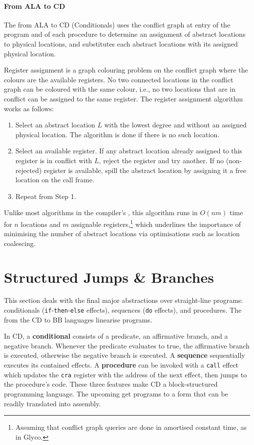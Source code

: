 \documentclass[main.tex]{subfiles}
\begin{document}
\paragraph{From ALA to CD} The  from ALA to CD (Conditionals) uses the conflict graph at entry of the program and of each procedure to determine an assignment of abstract locations to physical locations, and substitutes each abstract locations with its assigned physical location.

Register assignment is a graph colouring problem on the conflict graph where the colours are the available registers. No two connected locations in the conflict graph can be coloured with the same colour, i.e., no two locations that are in conflict can be assigned to the same register. The register assignment algorithm works as follows:
\begin{enumerate}
	\item Select an abstract location $L$ with the lowest degree and without an assigned physical location. The algorithm is done if there is no such location.
	\item Select an available register. If any abstract location already assigned to this register is in conflict with $L$, reject the register and try another. If no (non-rejected) register is available, spill the abstract location by assigning it a free location on the call frame.
	\item Repeat from Step 1.
\end{enumerate}

Unlike most algorithms in the compiler's , this algorithm runs in $O(nm)$ time for $n$ locations and $m$ assignable registers,\footnote{Assuming that conflict graph queries are done in amortised constant time, as in Glyco.} which underlines the importance of minimising the number of abstract locations via optimisations such as location coalescing.

\section{Structured Jumps \& Branches} \label{sct:cd}
This section deals with the final major abstractions over straight-line programs: conditionals (\texttt{if}-\texttt{then}-\texttt{else} effects), sequences (\texttt{do} effects), and procedures. The  from the CD to BB languages linearise programs.


In CD, a \textbf{conditional} consists of a predicate, an affirmative branch, and a negative branch. Whenever the predicate evaluates to true, the affirmative branch is executed, otherwise the negative branch is executed. A \textbf{sequence} sequentially executes its contained effects. A \textbf{procedure} can be invoked with a \texttt{call} effect which updates the \texttt{cra} register with the address of the next effect, then jumps to the procedure's code. These three features make CD a block-structured programming language. The upcoming  get programs to a form that can be readily translated into assembly.
\end{document}
